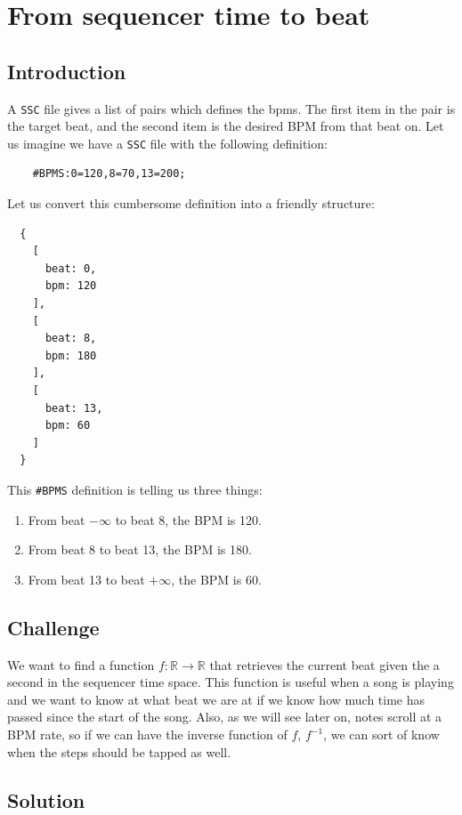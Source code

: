 \documentclass[a4paper,9pt]{article}
\begin{document}
    \section{From sequencer time to beat}

    \subsection{Introduction}\label{sec:stepmania-definition-time2beat}
    
    A \texttt{SSC} file gives a list of pairs which defines the bpms. The first item in the pair is the target beat, and the second item is the desired BPM from that beat on. Let us imagine we have a \texttt{SSC} file with the following definition:
    \begin{verbatim}
    #BPMS:0=120,8=70,13=200;     
    \end{verbatim}
    Let us convert this cumbersome definition into a friendly structure:
    \begin{verbatim}
  {
    [
      beat: 0,
      bpm: 120
    ],
    [
      beat: 8,
      bpm: 180 
    ],
    [
      beat: 13,
      bpm: 60 
    ]
  }
    \end{verbatim}

    This \texttt{\#BPMS} definition is telling us three things:
    \begin{enumerate}
	    \item From beat $- \infty$ to beat 8, the BPM is 120.
	    \item From beat 8 to beat 13, the BPM is 180.
	    \item From beat 13 to beat $+\infty$, the BPM is 60.
    \end{enumerate}

    \subsection{Challenge}

    We want to find a function $f : \mathbb{R} \rightarrow \mathbb{R}$ that retrieves the current beat given the a second in the sequencer time space.  This function is useful when a song is playing and we want to know at what beat we are at if we know how much time has passed since the start of the song. Also, as we will see later on, notes scroll at a BPM rate, so if we can have the inverse function of $f$, $ f^{-1} $, we can sort of know when the steps should be tapped as well.

    \subsection{Solution}
\end{document}
